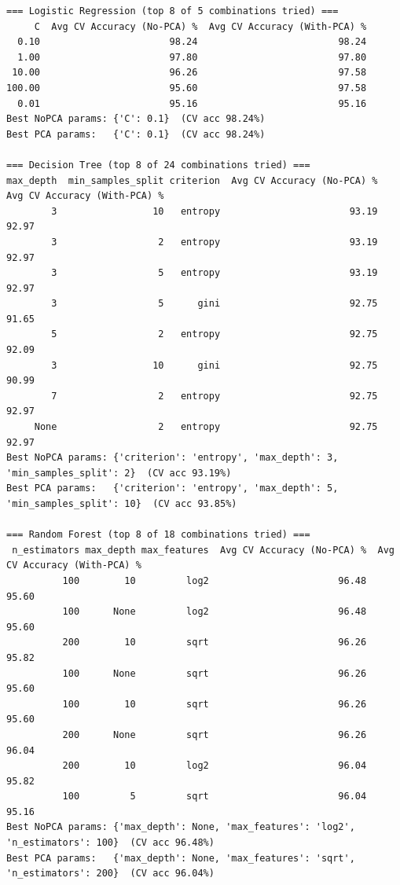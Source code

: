 \documentclass[12pt,a4paper]{article}
\begin{document}
\begin{verbatim}
=== Logistic Regression (top 8 of 5 combinations tried) ===
     C  Avg CV Accuracy (No-PCA) %  Avg CV Accuracy (With-PCA) %
  0.10                       98.24                         98.24
  1.00                       97.80                         97.80
 10.00                       96.26                         97.58
100.00                       95.60                         97.58
  0.01                       95.16                         95.16
Best NoPCA params: {'C': 0.1}  (CV acc 98.24%)
Best PCA params:   {'C': 0.1}  (CV acc 98.24%)

=== Decision Tree (top 8 of 24 combinations tried) ===
max_depth  min_samples_split criterion  Avg CV Accuracy (No-PCA) %  Avg CV Accuracy (With-PCA) %
        3                 10   entropy                       93.19                         92.97
        3                  2   entropy                       93.19                         92.97
        3                  5   entropy                       93.19                         92.97
        3                  5      gini                       92.75                         91.65
        5                  2   entropy                       92.75                         92.09
        3                 10      gini                       92.75                         90.99
        7                  2   entropy                       92.75                         92.97
     None                  2   entropy                       92.75                         92.97
Best NoPCA params: {'criterion': 'entropy', 'max_depth': 3, 'min_samples_split': 2}  (CV acc 93.19%)
Best PCA params:   {'criterion': 'entropy', 'max_depth': 5, 'min_samples_split': 10}  (CV acc 93.85%)

=== Random Forest (top 8 of 18 combinations tried) ===
 n_estimators max_depth max_features  Avg CV Accuracy (No-PCA) %  Avg CV Accuracy (With-PCA) %
          100        10         log2                       96.48                         95.60
          100      None         log2                       96.48                         95.60
          200        10         sqrt                       96.26                         95.82
          100      None         sqrt                       96.26                         95.60
          100        10         sqrt                       96.26                         95.60
          200      None         sqrt                       96.26                         96.04
          200        10         log2                       96.04                         95.82
          100         5         sqrt                       96.04                         95.16
Best NoPCA params: {'max_depth': None, 'max_features': 'log2', 'n_estimators': 100}  (CV acc 96.48%)
Best PCA params:   {'max_depth': None, 'max_features': 'sqrt', 'n_estimators': 200}  (CV acc 96.04%)


\end{verbatim}
\end{document}
